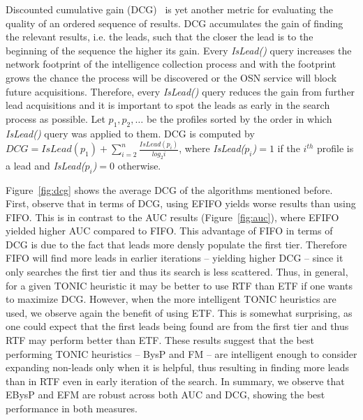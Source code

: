 \documentclass[journal]{IEEEtran}
\newcommand{\islead}[1]{{\em IsLead(#1)}}
\begin{document}
 

Discounted cumulative gain (DCG)~\cite{dcg} is yet another metric for evaluating the quality of an ordered  sequence of results.
DCG accumulates the gain of finding the relevant results, i.e. the leads, such that the closer the lead is to the beginning of the sequence the higher its gain. 
Every \islead{} query increases the network footprint of the intelligence collection process and with the footprint grows the chance the process will be discovered or the OSN service will block future acquisitions. 
Therefore, every \islead{} query reduces the gain from further lead acquisitions and it is important to spot the leads as early in the search process as possible.
Let \(p_1,p_2,\ldots\) be the profiles sorted by the order in which \islead{} query was applied to them. 
DCG is computed by $DCG=IsLead(p_1)+\sum_{i=2}^n \frac{IsLead(p_i)}{log_2 i}$, where \islead{\(p_i\)}\(=1\) if the $i^{th}$ profile is a lead and \islead{\(p_i\)}\(=0\) otherwise. 

Figure~\ref{fig:dcg} shows the average DCG of the algorithms mentioned before. First, observe that in terms of DCG, using EFIFO yields worse results than using FIFO. This is in contrast to the AUC results (Figure~\ref{fig:auc}), where EFIFO yielded higher AUC compared to FIFO. 
This advantage of FIFO in terms of DCG is due to the fact that leads more densly populate the first tier. Therefore FIFO will find more leads in earlier iterations -- yielding higher DCG -- since it only searches the first tier and thus its search is less scattered. Thus, in general, for a given TONIC heuristic it may be better to use RTF than ETF if one wants to maximize DCG. 
However, when the more intelligent TONIC heuristics are used, we observe again the benefit of using ETF. This is somewhat surprising, as one could expect that the first leads being found are from the first tier and thus RTF may perform better than ETF. These results suggest that the best performing TONIC heuristics -- BysP and FM -- are intelligent enough to consider expanding non-leads only when it is helpful, thus resulting in finding more leads than in RTF even in early iteration of the search. 
In summary, we observe that EBysP and EFM are robust across both AUC and DCG, showing the best performance in both measures. 

\end{document}
